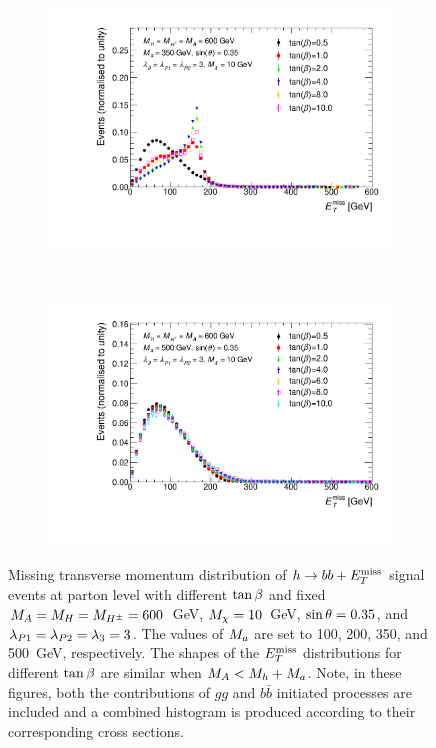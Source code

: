 \begin{figure}[tbp]
\begin{subfigure}{0.48\textwidth}
\includegraphics[width = \textwidth]{texinputs/04_grid/figures/monoHbb_tanb_scan_MA600_Ma350_MET_liny_norm2one.pdf}
\end{subfigure}
~
\begin{subfigure}{0.48\textwidth}
\includegraphics[width = \textwidth]{texinputs/04_grid/figures/monoHbb_tanb_scan_MA600_Ma500_MET_liny_norm2one.pdf}
\end{subfigure}
\caption[$\MET$ distribution in $h\rightarrow bb + \MET$ events for different 
$\tanb$ for $\mA = \mH = \mHc = 600 $ GeV]
{
Missing transverse momentum distribution of $h\rightarrow bb + \MET$ signal 
events at parton level with different $\tanb$ and
 fixed $\mA = \mH = \mHc = 600 $~GeV, $ M_{\chi} = 10$~GeV, $\sin\theta = 0.35$, 
and $ \lambda_{P1} = \lambda_{P2} = \lambda_{3} = 3 $. The values of $M_{a}$ are set to 100, 200, 
350, and 500~GeV, respectively.
The shapes of the $\MET$ distributions for different $\tanb$ are similar when 
$M_{A} < M_{h}+M_{a}$. Note, in these figures, both the contributions of $gg$ and $b\bar{b}$ 
initiated processes are included and a combined histogram is produced 
according to their corresponding cross sections.
\label{fig:monoHbb_tanb_scan_met}
}
\end{figure}

